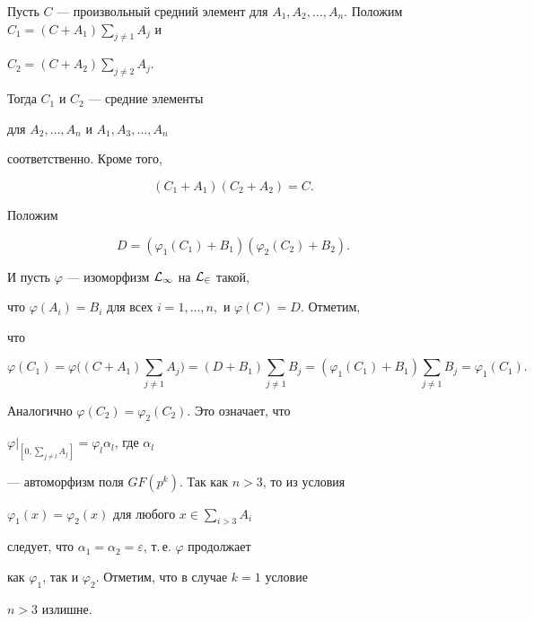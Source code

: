 \begin{pf}


Пусть $C$ --- произвольный средний элемент для $A_1,A_2,\dotsc,


A_n$. Положим $C_1=\left (C+A_1 \right) \sum \limits_{j \ne 1}A_j$ и


$C_2=\left (C+A_2 \right) \sum \limits_{j \ne 2}A_j$.


Тогда $C_1$ и $C_2$ --- средние элементы


для $A_2,\dotsc,A_n$ и $A_1,A_3,\dotsc,A_n$


соответственно. Кроме того,


$$


(C_1+A_1)(C_2+A_2)=C.


$$


Положим


$$


D=\left (\varphi_1(C_1)+B_1 \right)\left (\varphi_2(C_2)+B_2 \right).


$$


И пусть $\varphi$ --- изоморфизм $\cal L_1$ на $\cal L_2$ такой,


что $\varphi(A_i)=B_i$ для всех $i=1,\dotsc,n,$ и $\varphi(C)=D.$ Отметим,


что


$$


\varphi(C_1)=\varphi \Big((C+A_1) \sum \limits_{j \ne 1}A_j \Big)=


(D+B_1)\sum \limits_{j \ne 1}B_j=(\varphi_1 (C_1)+B_1)


\sum \limits_{j \ne 1}B_j = \varphi_1(C_1).


$$


Аналогично $\varphi(C_2)=\varphi_2(C_2)$. Это означает, что


$\varphi |_{[0,\sum \limits_{j \ne l}A_j]}=\varphi_l \alpha_l$, где $\alpha_l$


--- автоморфизм поля $GF(p^k)$. Так как $n>3$, то из условия


$\varphi_1(x)=\varphi_2(x)$ для любого $x \in \sum \limits_{i>3}A_i$


следует, что $\alpha_1=\alpha_2=\varepsilon$, т.\,е. $\varphi$ продолжает


как $\varphi_1$, так и $\varphi_2$. Отметим, что в случае $k=1$ условие


$n>3$ излишне.


\end{pf}





